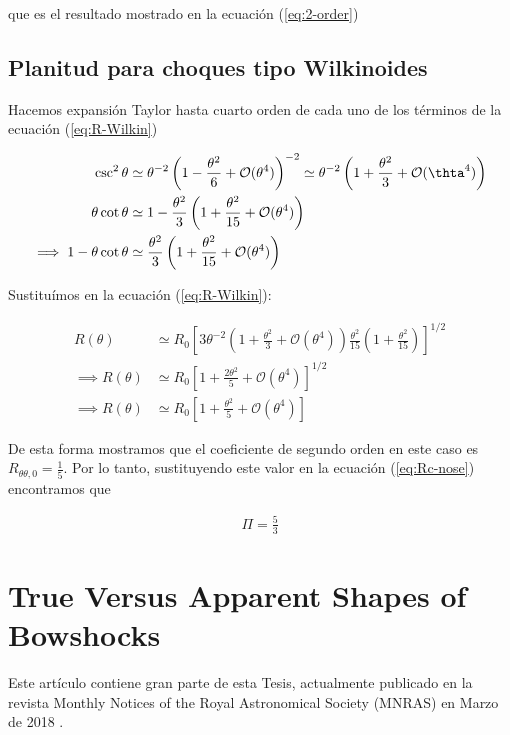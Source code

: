 que es el resultado mostrado en la ecuación (\ref{eq:2-order})

\section[Planitud Wilkinoides]{Planitud para choques tipo Wilkinoides}
\label{sec:Rc-Wilkin}
Hacemos expansión Taylor hasta cuarto orden de cada uno de los términos de la ecuación (\ref{eq:R-Wilkin})

\begin{align}
  \csc^2\theta &\simeq \theta^{-2}\left(1 - \frac{\theta^2}{6} + \mathcal{O}(\theta^4)\right)^{-2} \simeq
                 \theta^{-2}\left(1 + \frac{\theta^2}{3} + \mathcal{O}(\thta^4)\right) \\
  \theta\cot\theta &\simeq 1 - \frac{\theta^2}{3}\left(1 + \frac{\theta^2}{15} + \mathcal{O}(\theta^4)\right) \\
  \implies 1 -\theta\cot\theta &\simeq \frac{\theta^2}{3}\left(1 + \frac{\theta^2}{15} + \mathcal{O}(\theta^4)\right)
\end{align}

Sustituímos en la ecuación (\ref{eq:R-Wilkin}):

\begin{align}
  R(\theta) &\simeq R_0\left[3\theta^{-2}\left(1 + \frac{\theta^2}{3}+\mathcal{O}(\theta^4)\right)\frac{\theta^2}{15}
  \left(1 + \frac{\theta^2}{15}\right) \right]^{1/2} \\
  \implies R(\theta) &\simeq R_0\left[1 + \frac{2\theta^2}{5} + \mathcal{O}(\theta^4)\right]^{1/2} \\
  \implies R(\theta) &\simeq R_0\left[1 + \frac{\theta^2}{5} + \mathcal{O}(\theta^4)\right]
\end{align}

De esta forma mostramos que el coeficiente de segundo orden en este caso es $R_{\theta \theta, 0} = \frac{1}{5}$. Por lo tanto,
sustituyendo este valor en la ecuación (\ref{eq:Rc-nose}) encontramos que

\begin{align}
  \Pi = \frac{5}{3}
\end{align}

\chapter{True Versus Apparent Shapes of Bowshocks}
\label{app:article}
\thispagestyle{empty}

Este artículo contiene gran parte de esta Tesis, actualmente publicado en la revista Monthly Notices of the Royal Astronomical Society (MNRAS) en Marzo de 2018 \citep{Tarango-Yong:2018a}. 
